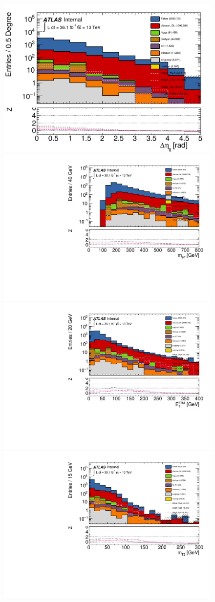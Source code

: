 \begin{figure}[htpb]
\centering
\includegraphics[width=0.45\linewidth]{data/plot/SR_redefinition/SRjet23_step0/leDeltaEtaLep_fakes.pdf}\includegraphics[width=0.45\linewidth]{data/plot/SR_redefinition/SRjet23_step0/lemeff_fakes.pdf}\\
\includegraphics[width=0.45\linewidth]{data/plot/SR_redefinition/SRjet23_step0/lemet_fakes.pdf}\includegraphics[width=0.45\linewidth]{data/plot/SR_redefinition/SRjet23_step0/lemt2ll_fakes.pdf}\\

\end{figure}
